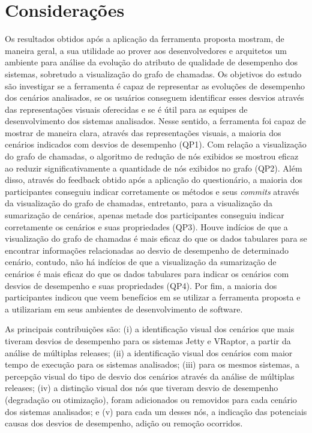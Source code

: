 \section{Considerações} \label{sec:avaliacao-consideracoes}

Os resultados obtidos após a aplicação da ferramenta proposta mostram, de maneira geral, a sua utilidade ao prover aos desenvolvedores e arquitetos um ambiente para análise da evolução do atributo de qualidade de desempenho dos sistemas, sobretudo a visualização do grafo de chamadas. Os objetivos do estudo são investigar se a ferramenta é capaz de representar as evoluções de desempenho dos cenários analisados, se os usuários conseguem identificar esses desvios através das representações visuais oferecidas e se é útil para as equipes de desenvolvimento dos sistemas analisados. Nesse sentido, a ferramenta foi capaz de mostrar de maneira clara, através das representações visuais, a maioria dos cenários indicados com desvios de desempenho (QP1). Com relação a visualização do grafo de chamadas, o algoritmo de redução de nós exibidos se mostrou eficaz ao reduzir significativamente a quantidade de nós exibidos no grafo (QP2). Além disso, através do feedback obtido após a aplicação do questionário, a maioria dos participantes conseguiu indicar corretamente os métodos e seus \textit{commits} através da visualização do grafo de chamadas, entretanto, para a visualização da sumarização de cenários, apenas metade dos participantes conseguiu indicar corretamente os cenários e suas propriedades (QP3). Houve indícios de que a visualização do grafo de chamadas é mais eficaz do que os dados tabulares para se encontrar informações relacionadas ao desvio de desempenho de determinado cenário, contudo, não há indícios de que a visualização da sumarização de cenários é mais eficaz do que os dados tabulares para indicar os cenários com desvios de desempenho e suas propriedades (QP4). Por fim, a maioria dos participantes indicou que veem benefícios em se utilizar a ferramenta proposta e a utilizariam em seus ambientes de desenvolvimento de software.

As principais contribuições são: (i) a identificação visual dos cenários que mais tiveram desvios de desempenho para os sistemas Jetty e VRaptor, a partir da análise de múltiplas releases; (ii) a identificação visual dos cenários com maior tempo de execução para os sistemas analisados; (iii) para os mesmos sistemas, a percepção visual do tipo de desvio dos cenários através da análise de múltiplas releases; (iv) a distinção visual dos nós que tiveram desvio de desempenho (degradação ou otimização), foram adicionados ou removidos para cada cenário dos sistemas analisados; e (v) para cada um desses nós, a indicação das potenciais causas dos desvios de desempenho, adição ou remoção ocorridos.

